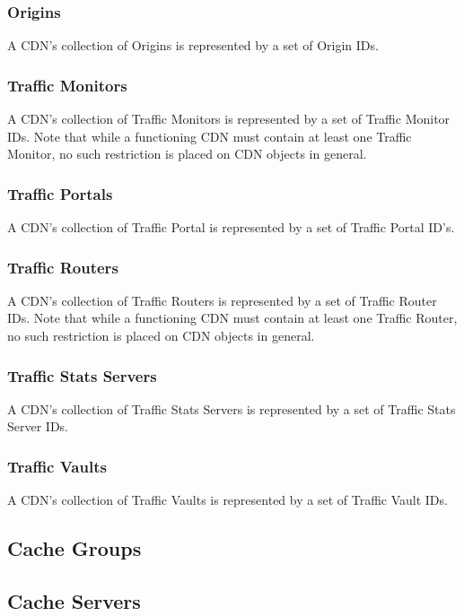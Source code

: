 \subsubsection{Origins}
A CDN's collection of Origins is represented by a set of Origin IDs.

\subsubsection{Traffic Monitors}
A CDN's collection of Traffic Monitors is represented by a set of Traffic Monitor
IDs. Note that while a functioning CDN must contain at least one Traffic Monitor,
no such restriction is placed on CDN objects in general.

\subsubsection{Traffic Portals}
A CDN's collection of Traffic Portal is represented by a set of Traffic Portal
ID's.

\subsubsection{Traffic Routers}
A CDN's collection of Traffic Routers is represented by a set of Traffic Router
IDs. Note that while a functioning CDN must contain at least one Traffic Router,
no such restriction is placed on CDN objects in general.

\subsubsection{Traffic Stats Servers}
A CDN's collection of Traffic Stats Servers is represented by a set of Traffic
Stats Server IDs.

\subsubsection{Traffic Vaults}
A CDN's collection of Traffic Vaults is represented by a set of Traffic Vault IDs.



\subsection{Cache Groups}



\subsection{Cache Servers}

